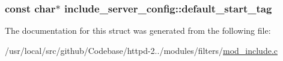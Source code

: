 \subsubsection[{\texorpdfstring{default\+\_\+start\+\_\+tag}{default_start_tag}}]{\setlength{\rightskip}{0pt plus 5cm}const char$\ast$ include\+\_\+server\+\_\+config\+::default\+\_\+start\+\_\+tag}\hypertarget{structinclude__server__config_ae7fd02881fcaabed109fefa1f6941c4c}{}\label{structinclude__server__config_ae7fd02881fcaabed109fefa1f6941c4c}


The documentation for this struct was generated from the following file\+:\begin{DoxyCompactItemize}
\item 
/usr/local/src/github/\+Codebase/httpd-\/2../modules/filters/\hyperlink{mod__include_8c}{mod\+\_\+include.\+c}\end{DoxyCompactItemize}
